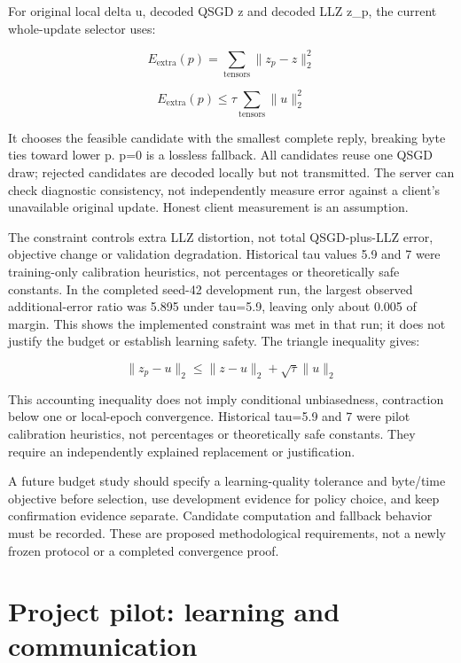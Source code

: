 For original local delta u, decoded QSGD z and decoded LLZ z\_p, the current whole-update selector uses:

\begin{equation*}E_{\mathrm{extra}}(p)=\sum_{\mathrm{tensors}}\|z_p-z\|_2^2\end{equation*}

\begin{equation*}E_{\mathrm{extra}}(p)\leq \tau\sum_{\mathrm{tensors}}\|u\|_2^2\end{equation*}

It chooses the feasible candidate with the smallest complete reply, breaking byte ties toward lower p. p=0 is a lossless fallback. All candidates reuse one QSGD draw; rejected candidates are decoded locally but not transmitted. The server can check diagnostic consistency, not independently measure error against a client's unavailable original update. Honest client measurement is an assumption.

The constraint controls extra LLZ distortion, not total QSGD-plus-LLZ error, objective change or validation degradation. Historical tau values 5.9 and 7 were training-only calibration heuristics, not percentages or theoretically safe constants. In the completed seed-42 development run, the largest observed additional-error ratio was 5.895 under tau=5.9, leaving only about 0.005 of margin. This shows the implemented constraint was met in that run; it does not justify the budget or establish learning safety. The triangle inequality gives:

\begin{equation*}\|z_p-u\|_2\leq\|z-u\|_2+\sqrt{\tau}\|u\|_2\end{equation*}

This accounting inequality does not imply conditional unbiasedness, contraction below one or local-epoch convergence. Historical tau=5.9 and 7 were pilot calibration heuristics, not percentages or theoretically safe constants. They require an independently explained replacement or justification.

A future budget study should specify a learning-quality tolerance and byte/time objective before selection, use development evidence for policy choice, and keep confirmation evidence separate. Candidate computation and fallback behavior must be recorded. These are proposed methodological requirements, not a newly frozen protocol or a completed convergence proof.

\section{Project pilot: learning and communication}

